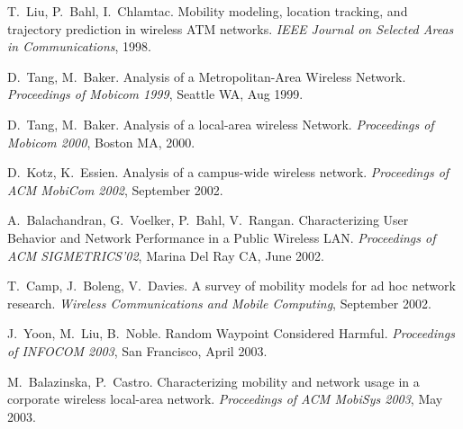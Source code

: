 \begin{thebibliography}{99}





T.~Liu, P.~Bahl, I.~Chlamtac.
Mobility modeling, location tracking, and trajectory prediction in wireless ATM networks.
\textit{IEEE Journal on Selected Areas in Communications}, 1998.

D.~Tang, M.~Baker. Analysis of a Metropolitan-Area Wireless Network.
\textit{Proceedings of Mobicom 1999}, Seattle WA, Aug 1999.

D.~Tang, M.~Baker. Analysis of a local-area wireless Network. \textit{Proceedings of Mobicom 2000}, Boston MA, 2000.

D.~Kotz, K.~Essien.
Analysis of a campus-wide wireless network.
\textit{Proceedings of ACM MobiCom 2002}, September 2002.

A.~Balachandran, G.~Voelker, P.~Bahl, V.~Rangan.
Characterizing User Behavior and Network Performance in a Public Wireless LAN.
\textit{Proceedings of ACM SIGMETRICS'02}, Marina Del Ray CA, June 2002.

T.~Camp, J.~Boleng, V.~Davies.
A survey of mobility models for ad hoc network research.
\textit{Wireless Communications and Mobile Computing}, September 2002.

J.~Yoon, M.~Liu, B.~Noble.
Random Waypoint Considered Harmful.
\textit{Proceedings of INFOCOM 2003}, San Francisco, April 2003.

M.~Balazinska, P.~Castro.
Characterizing mobility and network usage in a corporate wireless local-area network.
\textit{Proceedings of ACM MobiSys 2003}, May 2003.


\end{thebibliography}
